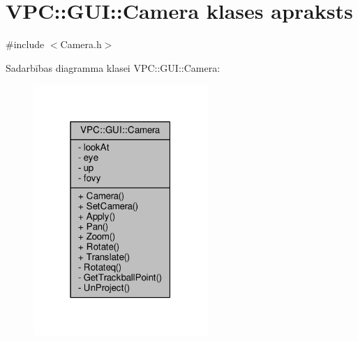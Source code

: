 \hypertarget{class_v_p_c_1_1_g_u_i_1_1_camera}{}\section{V\+PC\+:\+:G\+UI\+:\+:Camera klases apraksts}
\label{class_v_p_c_1_1_g_u_i_1_1_camera}


{\ttfamily \#include $<$Camera.\+h$>$}



Sadarbības diagramma klasei V\+PC\+:\+:G\+UI\+:\+:Camera\+:
\nopagebreak
\begin{figure}[H]
\begin{center}
\leavevmode
\includegraphics[width=187pt]{class_v_p_c_1_1_g_u_i_1_1_camera__coll__graph}
\end{center}
\end{figure}
